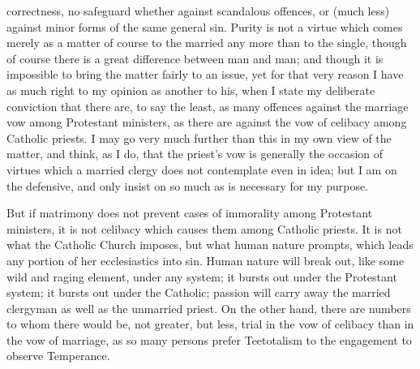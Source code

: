 correctness, no safeguard whether against scandalous
offences, or (much less) against minor forms of the same
general sin. Purity is not a virtue which comes merely as
a matter of course to the married any more than to the
single, though of course there is a great difference
between man and man; and though it is impossible to bring
the matter fairly to an issue, yet for that very reason I
have as much right to my opinion as another to his, when
I state my deliberate conviction that there are, to say
the least, as many offences against the marriage vow
among Protestant ministers, as there are against the vow
of celibacy among Catholic priests. I may go very much
further than this in my own view of the matter, and
think, as I do, that the priest's vow is generally the
occasion of virtues which a married clergy does not contemplate even in idea; but I am on the defensive, and
only insist on so much as is necessary for my purpose.

But if matrimony does not prevent cases of immorality
among Protestant ministers, it is not celibacy which
causes them among Catholic priests. It is not what the
Catholic Church imposes, but what human nature prompts,
which leads any portion of her ecclesiastics into sin.
Human nature will break out, like some wild and raging
element, under any system; it bursts out under the
Protestant system; it bursts out under the Catholic;
passion will carry away the married clergyman as well as
the unmarried priest. On the other hand, there are
numbers to whom there would be, not greater, but less,
trial in the vow of celibacy than in the vow of marriage,
as so many persons prefer Teetotalism to the engagement
to observe Temperance.

